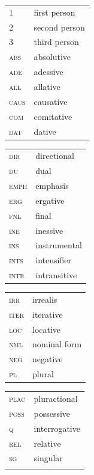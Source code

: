 \documentclass[output=paper,colorlinks,citecolor=brown,draft]{langscibook}
\begin{document}
\begin{tabularx}{.45\textwidth}{lQ}
\scshape 1 & first person \\
\scshape 2 & second person \\
\scshape 3 & third person \\
\scshape abs & absolutive \\
\scshape ade & adessive \\
\scshape all & allative \\
\scshape caus & causative \\
\scshape com & comitative \\
\scshape dat & dative \\
\end{tabularx}
\begin{tabularx}{.45\textwidth}{lQ}
\scshape dir & directional \\
\scshape du & dual \\
\scshape emph & emphasis \\
\scshape erg & ergative \\
\scshape fnl & final \\
\scshape ine & inessive \\
\scshape ins & instrumental \\
\scshape ints & intensifier \\
\scshape intr & intransitive \\
\end{tabularx}

\begin{tabularx}{.45\textwidth}{lQ}
\scshape irr & irrealis \\
\scshape iter & iterative \\
\scshape loc & locative \\
\scshape nml & nominal form \\
\scshape neg & negative \\
\scshape pl & plural \\
\end{tabularx}
\begin{tabularx}{.45\textwidth}{lQ}
\scshape plac & pluractional \\
\scshape poss & possessive \\
\scshape q & interrogative \\
\scshape rel & relative \\
\scshape sg & singular \\
\\
\end{tabularx}

\printbibliography[heading=subbibliography,notkeyword=this]
\end{document}
